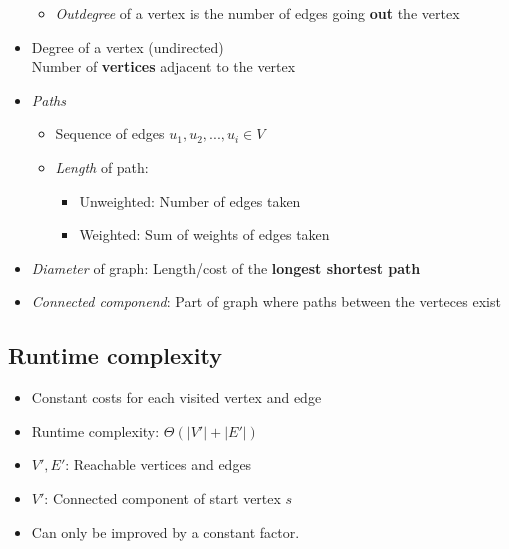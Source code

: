 \documentclass[12pt, a4paper]{scrartcl}
\begin{document}
\begin{itemize}
\begin{itemize}
  \item \emph{Outdegree} of a vertex is the number of edges going \textbf{out} the vertex
  \end{itemize}
\item Degree of a vertex (undirected)\\
  Number of \textbf{vertices} adjacent to the vertex
\item \emph{Paths}
  \begin{itemize}
  \item Sequence of edges $u_1,u_2,...,u_i\in V$
  \item \emph{Length} of path:
    \begin{itemize}
    \item Unweighted: Number of edges taken
    \item Weighted: Sum of weights of edges taken
    \end{itemize}
  \end{itemize}
\item \emph{Diameter} of graph: Length/cost of the \textbf{longest shortest path}
\item \emph{Connected componend}: Part of graph where paths between the verteces exist
\end{itemize}

\subsection{Runtime complexity}
\begin{itemize}
\item Constant costs for each visited vertex and edge
\item Runtime complexity: $\Theta(|V'|+|E'|)$
\item $V',E'$: Reachable vertices and edges
\item $V'$: Connected component of start vertex $s$
\item Can only be improved by a constant factor.
\end{itemize}
\end{document}
